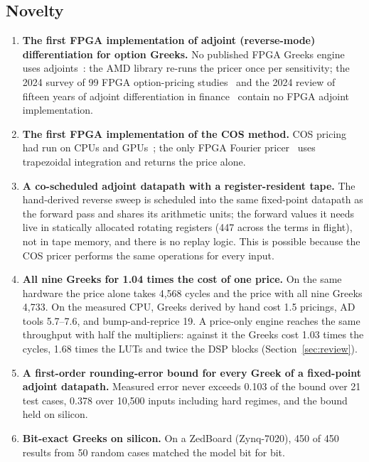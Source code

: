 \documentclass[11pt,a4paper]{article}
\begin{document}
\subsection{Novelty}
\begin{enumerate}[label=\textbf{\arabic*.}]
  \item \textbf{The first FPGA implementation of adjoint (reverse-mode)
  differentiation for option Greeks.} No published FPGA Greeks engine uses
  adjoints~\cite{klai1,klai2,vitis}: the AMD library re-runs the pricer once per
  sensitivity; the 2024 survey of 99
  FPGA option-pricing studies~\cite{survey} and the 2024 review of fifteen years of
  adjoint differentiation in finance~\cite{aadreview} contain no FPGA adjoint
  implementation.
  \item \textbf{The first FPGA implementation of the COS method.} COS pricing had
  run on CPUs and GPUs~\cite{zhang}; the only FPGA Fourier pricer~\cite{vitis} uses
  trapezoidal integration and returns the price alone.
  \item \textbf{A co-scheduled adjoint datapath with a register-resident tape.} The
  hand-derived reverse sweep is scheduled into the same fixed-point datapath as the forward
  pass and shares its arithmetic units; the forward values it needs live in statically
  allocated rotating registers (447 across the terms in flight), not in tape memory, and
  there is no replay logic. This is possible because the COS pricer performs the same
  operations for every input.
  \item \textbf{All nine Greeks for 1.04 times the cost of one price.} On the same
  hardware the price alone takes 4,568 cycles and the price with all nine Greeks
  4,733. On the measured CPU, Greeks derived by hand cost 1.5 pricings, AD tools
  5.7--7.6, and bump-and-reprice 19. A price-only engine reaches the same throughput with
  half the multipliers: against it the Greeks cost 1.03 times the cycles, 1.68 times the
  LUTs and twice the DSP blocks (Section~\ref{sec:review}).
  \item \textbf{A first-order rounding-error bound for every Greek of a fixed-point
  adjoint datapath.} Measured error never exceeds 0.103 of the bound over 21 test cases, 0.378
  over 10,500 inputs including hard regimes, and the bound held on silicon.
  \item \textbf{Bit-exact Greeks on silicon.} On a ZedBoard (Zynq-7020), 450 of 450
  results from 50 random cases matched the model bit for bit.
\end{enumerate}
\end{document}
